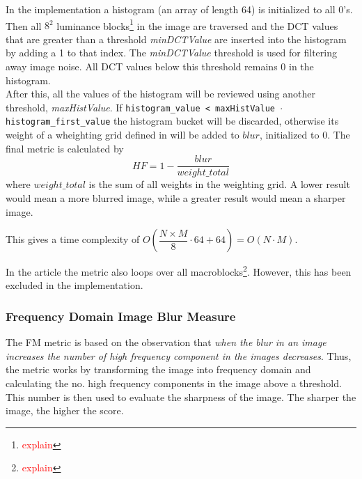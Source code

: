 In the implementation\cite{code_HF} a histogram (an array of length 64) is initialized to all 0's. Then all $8^2$ luminance blocks\footnote{\textcolor{red}{explain}} in the image are traversed and the DCT values that are greater than a threshold \textit{minDCTValue} are inserted into the histogram by adding a 1 to that index. The \textit{minDCTValue} threshold is used for filtering away image noise. All DCT values below this threshold remains 0 in the histogram.\\
After this, all the values of the histogram will be reviewed using another threshold, \textit{maxHistValue}. If \texttt{histogram\_value < maxHistValue $\cdot$ histogram\_first\_value} the histogram bucket will be discarded, otherwise its weight of a wheighting grid defined in \cite{jnbm12} will be added to $blur$, initialized to 0. The final metric is calculated by
$$HF=1-\dfrac{blur}{weight\_total}$$
where $weight\_total$ is the sum of all weights in the weighting grid. A lower result would mean a more blurred image, while a greater result would mean a sharper image.

This gives a time complexity of $O(\dfrac{N\times M}{8}\cdot 64 + 64) = O(N\cdot M)$.



In the article\cite{jnbm12} the metric also loops over all macroblocks\footnote{\textcolor{red}{explain}}. However, this has been excluded in the implementation\cite{code_HF}.


\subsubsection{Frequency Domain Image Blur Measure}
The FM metric is based on the observation that \textit{when the blur in an image increases the number of high frequency component in the images
decreases}\cite{FM}. Thus, the metric works by transforming the image into frequency domain and calculating the no. high frequency components in the image above a threshold. This number is then used to evaluate the sharpness of the image. The sharper the image, the higher the score.

